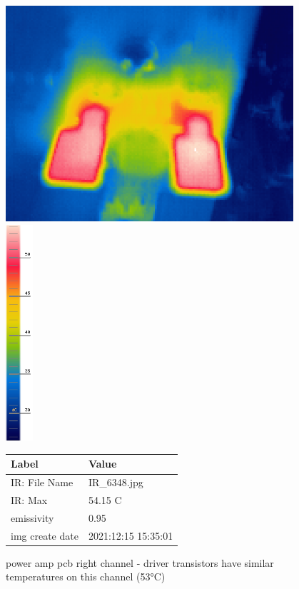 \documentclass[a4paper,twoside,notitlepage]{article}
\begin{document}
\begin{figure}[hptb!]
 \centering
 \includegraphics[height=8cm, keepaspectratio=true]{img_report/IR_6348}
 \includegraphics[height=8cm, keepaspectratio=true]{img_report/IR_6348_scale}
 \label{fig:pwr-left-ch-ir}

 \vspace*{5mm}
 \begin{tabular}{ l | l }
  Label & Value \\ \hline
  IR: File Name & IR\_6348.jpg \\
  IR: Max & 54.15 C \\
  emissivity & 0.95 \\
  img create date & 2021:12:15 15:35:01 \\
 \end{tabular}
 \caption{power amp pcb right channel - driver transistors have similar temperatures on this channel (53\si{\celsius})}
\end{figure}
\end{document}
